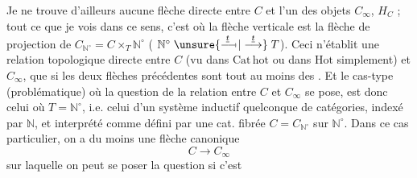 
Je ne trouve d'ailleurs aucune flèche directe entre $C$ et l'un des objets $C_\infty$, $H_C$ ; tout ce que je vois  dans ce sens, c'est
où la flèche verticale est la flèche de projection de $C_{\mathbb N^\circ}=C\times_T\mathbb N^\circ$ ( $\mathbb N^\circ\mathrel{\unsure{\overset{\underline t}{\relbar\joinrel\relbar\mkern-2mu\mapstochar}|\overset{\underline t}{\longrightarrow}}}T$). Ceci n'établit une relation  topologique directe entre $C$ (vu dans $\mathrm{Cat\,hot}$ ou dans $\mathrm{Hot}$ simplement) et $C_\infty$, que si les deux flèches précédentes sont  tout au moins des . Et le cas-type (problématique) où la question de la relation entre $C$ et $C_\infty$ se pose, est donc celui où $T=\mathbb N^\circ$, i.e. celui d'un système inductif quelconque de   catégories, indexé par $\mathbb N$, et interprété comme défini par une cat. fibrée $C=C_{\mathbb N^\circ}$ sur $\mathbb N^\circ$. Dans ce cas particulier, on a du moins une flèche canonique
\[
C\longrightarrow C_\infty
\]
sur laquelle on peut se poser la question si c'est
